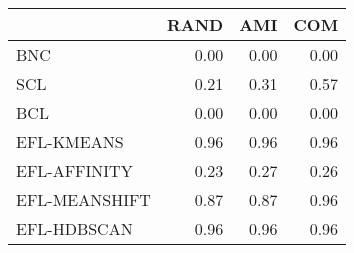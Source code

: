 \begin{tabular}{lrrr}
\toprule
 & RAND & AMI & COM \\
\midrule
BNC & 0.00 & 0.00 & 0.00 \\
SCL & 0.21 & 0.31 & 0.57 \\
BCL & 0.00 & 0.00 & 0.00 \\
EFL-KMEANS & 0.96 & 0.96 & 0.96 \\
EFL-AFFINITY & 0.23 & 0.27 & 0.26 \\
EFL-MEANSHIFT & 0.87 & 0.87 & 0.96 \\
EFL-HDBSCAN & 0.96 & 0.96 & 0.96 \\
\bottomrule
\end{tabular}
